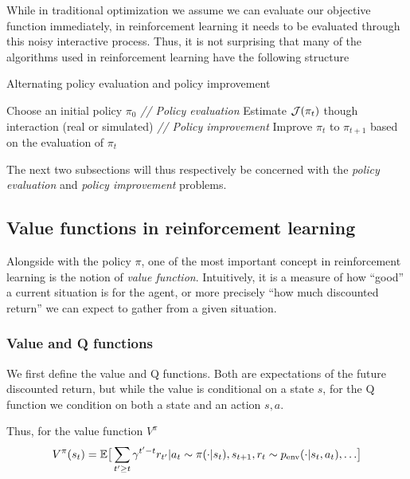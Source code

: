 While in traditional optimization we assume we can evaluate our objective function immediately, in reinforcement learning it needs to be evaluated through this noisy interactive process. Thus, it is not surprising that many of the algorithms used in reinforcement learning have the following structure

\begin{center}
\begin{minipage}{0.9\textwidth}
\begin{algorithm}[H]
\caption{Alternating policy evaluation and policy improvement}
\label{alg:eval_improv}
\begin{algorithmic}[1]
\STATE Choose an initial policy $\pi_0$ 
\STATE \textit{// Policy evaluation}
\STATE Estimate ${\mathcal{J}}(\pi_t)$ though interaction (real or simulated)
\STATE \textit{// Policy improvement}
\STATE Improve $\pi_t$ to $\pi_{t+1}$ based on the evaluation of $\pi_t$
\ENDFOR
\end{algorithmic}
\end{algorithm}
\end{minipage}
\end{center}
\vspace{1em}

The next two subsections will thus respectively be concerned with the \emph{policy evaluation} and \emph{policy improvement} problems.

\subsection{Value functions in reinforcement learning}
Alongside with the policy $\pi$, one of the most important concept in reinforcement learning is the notion of \emph{value function}.
Intuitively, it is a measure of how ``good'' a current situation is for the agent, or more precisely ``how much discounted return'' we can expect to gather from a given situation.

\subsubsection{Value and Q functions}
We first define the value and Q functions. Both are expectations of the future discounted return, but while the value is conditional on a state $s$, for the Q function we condition on both a state and an action $s, a$.

Thus, for the value function $V^\pi$
\begin{equation}
    V^\pi(s_t) = \mathbb{E} \big[ \sum_{t' \ge t} \gamma^{t'-t} r_{t'} | {a_t \sim \pi(\cdot|s_t), s_{t+1}, r_t \sim p_{\text{env}}(\cdot | s_t, a_t), \dots} \big] 
\end{equation}

